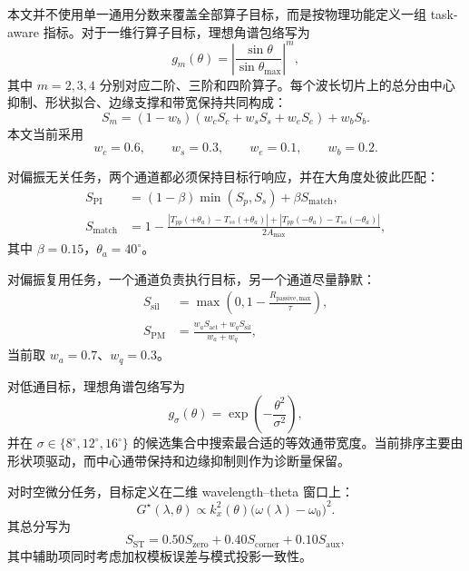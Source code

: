 \documentclass[10pt,a4paper]{article}
\begin{document}
本文并不使用单一通用分数来覆盖全部算子目标，而是按物理功能定义一组 task-aware 指标。对于一维行算子目标，理想角谱包络写为
\begin{equation}
g_m(\theta)=\left|\frac{\sin\theta}{\sin\theta_{\max}}\right|^m,
\end{equation}
其中 $m=2,3,4$ 分别对应二阶、三阶和四阶算子。每个波长切片上的总分由中心抑制、形状拟合、边缘支撑和带宽保持共同构成：
\begin{equation}
S_m=(1-w_b)\left(w_cS_c+w_sS_s+w_eS_e\right)+w_bS_b.
\end{equation}
本文当前采用
\begin{equation}
w_c=0.6,\qquad w_s=0.3,\qquad w_e=0.1,\qquad w_b=0.2.
\end{equation}

对偏振无关任务，两个通道都必须保持目标行响应，并在大角度处彼此匹配：
\begin{align}
S_{\mathrm{PI}}&=(1-\beta)\min(S_p,S_s)+\beta S_{\mathrm{match}},\\
S_{\mathrm{match}}&=1-\frac{|T_{pp}(+\theta_a)-T_{ss}(+\theta_a)|+|T_{pp}(-\theta_a)-T_{ss}(-\theta_a)|}{2A_{\max}},
\end{align}
其中 $\beta=0.15$，$\theta_a=40^\circ$。

对偏振复用任务，一个通道负责执行目标，另一个通道尽量静默：
\begin{align}
S_{\mathrm{sil}}&=\max\left(0,1-\frac{R_{\mathrm{passive,max}}}{\tau}\right),\\
S_{\mathrm{PM}}&=\frac{w_aS_{\mathrm{act}}+w_qS_{\mathrm{sil}}}{w_a+w_q},
\end{align}
当前取 $w_a=0.7$、$w_q=0.3$。

对低通目标，理想角谱包络写为
\begin{equation}
g_\sigma(\theta)=\exp\!\left(-\frac{\theta^2}{\sigma^2}\right),
\end{equation}
并在 $\sigma\in\{8^\circ,12^\circ,16^\circ\}$ 的候选集合中搜索最合适的等效通带宽度。当前排序主要由形状项驱动，而中心通带保持和边缘抑制则作为诊断量保留。

对时空微分任务，目标定义在二维 wavelength--theta 窗口上：
\begin{equation}
G^{\star}(\lambda,\theta)\propto k_x^2(\theta)\bigl(\omega(\lambda)-\omega_0\bigr)^2.
\end{equation}
其总分写为
\begin{equation}
S_{\mathrm{ST}}=0.50S_{\mathrm{zero}}+0.40S_{\mathrm{corner}}+0.10S_{\mathrm{aux}},
\end{equation}
其中辅助项同时考虑加权模板误差与模式投影一致性。
\end{document}
